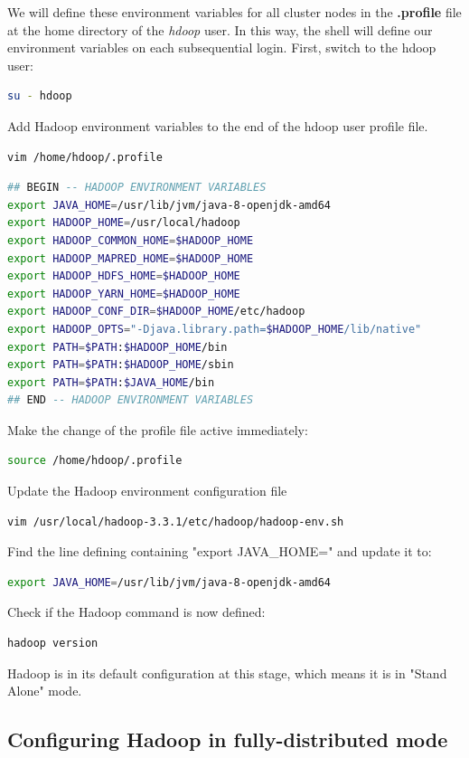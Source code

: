 \documentclass[12pt,english]{book}
\begin{document}
We will define these environment variables for all cluster nodes in the \textbf{.profile} file at the home directory of the \textit{hdoop} user. In this way, the shell will define our environment variables on each subsequential login.
First, switch to the hdoop user:
\begin{lstlisting}[language=bash, frame=single]
su - hdoop
\end{lstlisting}
Add Hadoop environment variables to the end of the hdoop user profile file.
\begin{lstlisting}[language=bash, frame=single]
vim /home/hdoop/.profile
\end{lstlisting}
\begin{lstlisting}[language=bash, frame=single]
## BEGIN -- HADOOP ENVIRONMENT VARIABLES
export JAVA_HOME=/usr/lib/jvm/java-8-openjdk-amd64
export HADOOP_HOME=/usr/local/hadoop
export HADOOP_COMMON_HOME=$HADOOP_HOME
export HADOOP_MAPRED_HOME=$HADOOP_HOME
export HADOOP_HDFS_HOME=$HADOOP_HOME
export HADOOP_YARN_HOME=$HADOOP_HOME
export HADOOP_CONF_DIR=$HADOOP_HOME/etc/hadoop
export HADOOP_OPTS="-Djava.library.path=$HADOOP_HOME/lib/native"
export PATH=$PATH:$HADOOP_HOME/bin
export PATH=$PATH:$HADOOP_HOME/sbin
export PATH=$PATH:$JAVA_HOME/bin
## END -- HADOOP ENVIRONMENT VARIABLES
\end{lstlisting}
Make the change of the profile file active immediately:
\begin{lstlisting}[language=bash, frame=single]
source /home/hdoop/.profile
\end{lstlisting}
Update the Hadoop environment configuration file 
\begin{lstlisting}[language=bash, frame=single]
vim /usr/local/hadoop-3.3.1/etc/hadoop/hadoop-env.sh
\end{lstlisting}
Find the line defining containing "export JAVA\_HOME=" and update it to:
\begin{lstlisting}[language=bash, frame=single]
export JAVA_HOME=/usr/lib/jvm/java-8-openjdk-amd64
\end{lstlisting}
Check if the Hadoop command is now defined:
\begin{lstlisting}[language=bash, frame=single]
hadoop version
\end{lstlisting}
Hadoop is in its default configuration at this stage, which means it is in "Stand Alone" mode.


\subsection{Configuring Hadoop in fully-distributed mode}
\end{document}
